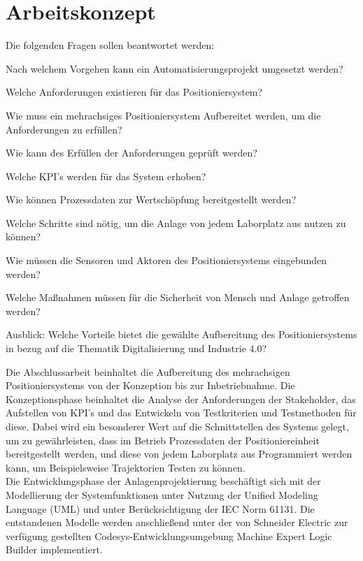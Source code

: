 \documentclass[12pt, a4paper, twoside]{article} %
\begin{document}
\section{Arbeitskonzept}
Die folgenden Fragen sollen beantwortet werden:
\begin{compactitem}
	\item Nach welchem Vorgehen kann ein Automatisierungsprojekt umgesetzt werden?
	\item Welche Anforderungen existieren für das Positioniersystem?
	\item Wie muss ein mehrachsiges Positioniersystem Aufbereitet werden, um die Anforderungen zu erfüllen?
	\item Wie kann des Erfüllen der Anforderungen geprüft werden?
	\item Welche KPI's werden für das System erhoben?
	\item Wie können Prozessdaten zur Wertschöpfung bereitgestellt werden?
	\item Welche Schritte sind nötig, um die Anlage von jedem Laborplatz aus nutzen zu können?
	\item Wie müssen die Sensoren und Aktoren des Positioniersystems eingebunden werden?
	\item Welche Maßnahmen müssen für die Sicherheit von Mensch und Anlage getroffen werden?
	\item Ausblick: Welche Vorteile bietet die gewählte Aufbereitung des Positioniersystems in bezug auf die Thematik Digitalisierung und Industrie 4.0?
\end{compactitem}
Die Abschlussarbeit beinhaltet die Aufbereitung des mehrachsigen Positioniersystems von der Konzeption bis zur Inbetriebnahme. Die Konzeptionsphase beinhaltet die Analyse der Anforderungen der Stakeholder, das Aufstellen von KPI's und das Entwickeln von Testkriterien und Testmethoden für diese. Dabei wird ein besonderer Wert auf die Schnittstellen  des Systems gelegt, um zu gewährleisten, dass im Betrieb Prozessdaten der Positioniereinheit bereitgestellt werden, und diese von jedem Laborplatz aus Programmiert werden kann, um Beispielsweise Trajektorien Testen zu können.\\
Die Entwicklungsphase der Anlagenprojektierung beschäftigt sich mit der Modellierung der Systemfunktionen unter Nutzung der Unified Modeling Language (UML) und unter Berücksichtigung der IEC Norm 61131. Die entstandenen Modelle werden anschließend unter der von Schneider Electric zur verfügung gestellten Codesys-Entwicklungsumgebung \glqq Machine Expert Logic Builder\grqq{} implementiert.\\
\end{document}
